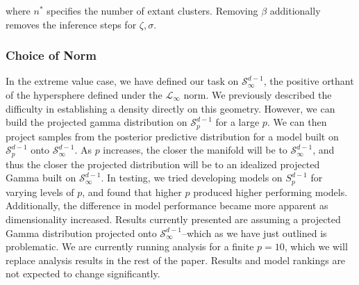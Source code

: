   where $n^*$ specifies the number of extant clusters.  Removing $\beta$ additionally removes the
  inference steps for $\zeta,\sigma$.

\subsubsection{Choice of Norm}
In the extreme value case, we have defined our task on $\mathcal{S}_{\infty}^{d-1}$, the positive orthant
  of the hypersphere defined under the $\mathcal{L}_{\infty}$ norm.  We previously described the 
  difficulty in establishing a density directly on this geometry.  However, we can build the projected gamma
  distribution on $\mathcal{S}_p^{d-1}$ for a large $p$.  We can then project samples from the posterior
  predictive distribution for a model built on $\mathcal{S}_p^{d-1}$ onto $\mathcal{S}_{\infty}^{d-1}$.
  As $p$ increases, the closer the manifold will be to $\mathcal{S}_{\infty}^{d-1}$, and thus the closer the
  projected distribution will be to an idealized projected Gamma built on $\mathcal{S}_{\infty}^{d-1}$.  In
  testing, we tried developing models on $S_p^{d-1}$ for varying levels of $p$, and found that higher $p$
  produced higher performing models.  Additionally, the difference in model performance became more apparent
  as dimensionality increased.  Results currently presented are assuming a projected Gamma distribution
  projected onto $\mathcal{S}_{\infty}^{d-1}$--which as we have just outlined is problematic.  We are
  currently running analysis for a finite $p = 10$, which we will replace analysis results in the rest of the
  paper.  Results and model rankings are not expected to change significantly.

